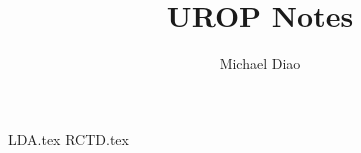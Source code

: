 \documentclass[12pt,letterpaper]{scrartcl}
\newcommand*{\importchapter}[1]{{#1.tex}}
\begin{document}
\title{UROP Notes}
\author{Michael Diao}
\date{\vspace{-5ex}}

\maketitle
\tableofcontents

\pagebreak

\importchapter{LDA}
\pagebreak
\importchapter{RCTD}
\end{document}

